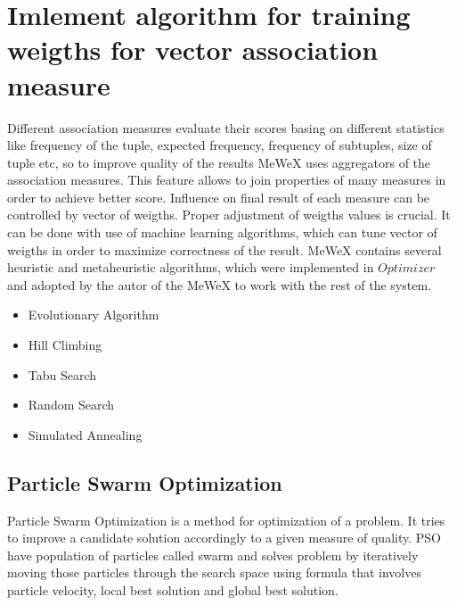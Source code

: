\chapter{Imlement algorithm for training weigths for vector association measure}\label{vam_descr}

Different association measures evaluate their scores basing on different statistics like frequency of the tuple, 
expected frequency, frequency of subtuples, size of tuple etc, so to improve quality of the results MeWeX uses 
aggregators of the association measures. This feature allows to join properties of many measures in order to achieve 
better score. Influence on final result of each measure can be controlled by vector of weigths. Proper adjustment 
of weigths values is crucial. It can be done with use of machine learning algorithms, which can tune vector of weigths 
in order to maximize correctness of the result. MeWeX contains several heuristic and metaheuristic algorithms, 
which were implemented in \(Optimizer\)\cite{klyk} and adopted by the autor of the MeWeX to work with the rest of the system.
\begin{itemize}
    \setlength\itemsep{0em}
    \item Evolutionary Algorithm 
    \item Hill Climbing 
    \item Tabu Search 
    \item Random Search 
    \item Simulated Annealing
\end{itemize}

\section{Particle Swarm Optimization}\label{pso_def}

Particle Swarm Optimization is a method for optimization of a problem. It tries to improve a candidate solution 
accordingly to a given measure of quality. PSO have population of particles called swarm and solves problem by iteratively moving those particles 
through the search space using formula that involves particle velocity, local best solution and global best solution. 

